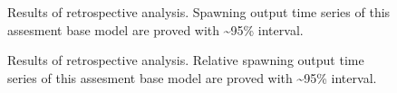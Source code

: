 \documentclass[
]{scrartcl}
\begin{document}
\begin{figure}


\caption{\label{fig-retro-sp-output}Results of retrospective analysis.
Spawning output time series of this assesment base model are proved with
\textasciitilde95\% interval.}

\end{figure}%

\begin{figure}


\caption{\label{fig-retro-rel-biomass}Results of retrospective analysis.
Relative spawning output time series of this assesment base model are
proved with \textasciitilde95\% interval.}

\end{figure}%
\end{document}
